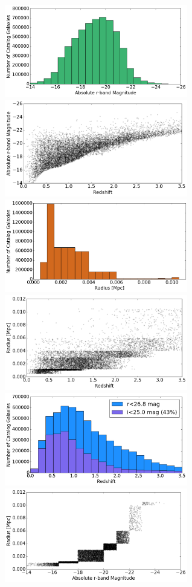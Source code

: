 \begin{figure}[h]
\begin{center}
\includegraphics[width=8cm]{hg_Mr_dist.png}
\includegraphics[width=8cm]{hg_Mr_vs_z.png}
\includegraphics[width=8cm]{hg_rad_dist.png}
\includegraphics[width=8cm]{hg_rad_vs_z.png}
\includegraphics[width=8cm]{hg_z_dist.png}
\includegraphics[width=8cm]{hg_rad_vs_Mr.png}

\end{center}
\end{figure}
